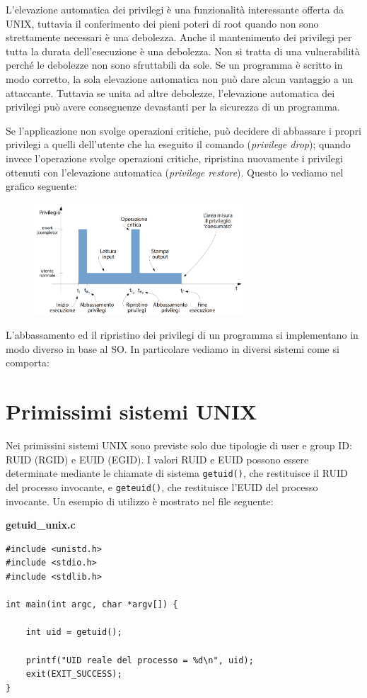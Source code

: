L'elevazione automatica dei privilegi è una funzionalità interessante offerta da UNIX, tuttavia il conferimento dei pieni poteri di root quando non sono strettamente necessari è una debolezza. Anche il mantenimento dei privilegi per tutta la durata dell'esecuzione è una debolezza. Non si tratta di una vulnerabilità perché le debolezze non sono sfruttabili da sole. Se un programma è scritto in modo corretto, la sola elevazione automatica non può dare alcun vantaggio a un attaccante. Tuttavia se unita ad altre debolezze, l'elevazione automatica dei privilegi può avere conseguenze devastanti per la sicurezza di un programma.

Se l'applicazione non svolge operazioni critiche, può decidere di abbassare i propri privilegi a quelli dell'utente che ha eseguito il comando (\textit{privilege drop}); quando invece l'operazione svolge operazioni critiche, ripristina nuovamente i privilegi ottenuti con l'elevazione automatica (\textit{privilege restore}). Questo lo vediamo nel grafico seguente:

\begin{figure}[hbpt!]
    \centering
    \includegraphics[width=0.7\textwidth]{./Images/cap4/4.2.png}
\end{figure}
\FloatBarrier

L'abbassamento ed il ripristino dei privilegi di un programma si implementano in modo diverso in base al SO. In particolare vediamo in diversi sistemi come si comporta:

\section{Primissimi sistemi UNIX}
Nei primissini sistemi UNIX sono previste solo due tipologie di user e group ID: RUID (RGID) e EUID (EGID). I valori RUID e EUID possono essere determinate mediante le chiamate di sistema \texttt{getuid()}, che restituisce il RUID del processo invocante, e \texttt{geteuid()}, che restituisce l'EUID del processo invocante. Un esempio di utilizzo è mostrato nel file seguente:
\begin{mdframed}[backgroundcolor=white!20,shadow=false]
\textbf{getuid\_unix.c}

\begin{verbatim}
#include <unistd.h>
#include <stdio.h>
#include <stdlib.h>

int main(int argc, char *argv[]) {

	int uid = getuid();

	printf("UID reale del processo = %d\n", uid);
	exit(EXIT_SUCCESS);
}

\end{verbatim}
\end{mdframed}

